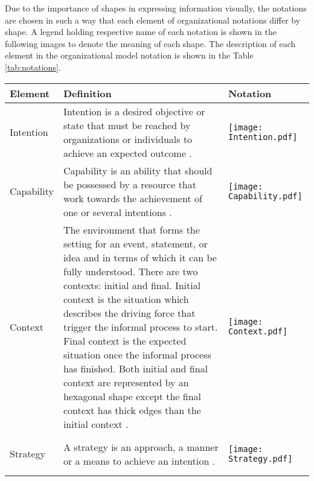 Due to the importance of shapes in expressing information visually, the notations are chosen in such a way that each element of organizational notations differ by shape. A legend holding respective name of each notation is shown in the following images to denote the meaning of each shape. The description of each element in the organizational model notation is shown in the Table \ref{tab:notations}. 

\begin{center}
	\begin{longtable}{p{3cm}p{10cm}p{3cm}}
		\toprule 
		\textbf{Element} & \textbf{Definition} & \textbf{Notation} \\
		\midrule
		\endfirsthead
		Intention 			& Intention is a desired objective or state that must be reached by organizations or individuals to achieve an expected outcome \cite{DelaVaraGonzalez2007}. & \begin{center} \texttt{[image: Intention.pdf]}  \end{center}  \\
		
		Capability	&  Capability is an ability that should be possessed by a resource that work towards the achievement of one or several intentions \cite{Sierr2015}.   & \begin{center} \texttt{[image: Capability.pdf]} \end{center}  \\
		
		Context				& The environment that forms the setting for an event, statement, or idea and in terms of which it can be fully understood. There are two contexts: initial and final. Initial context is the situation which describes the driving force that trigger the informal process to start. Final context is the expected situation once the informal process has finished. Both initial and final context are represented by an hexagonal shape except the final context has thick edges than the initial context \cite{Sierr2015}.  & \begin{center} \texttt{[image: Context.pdf]} \end{center}   \\
		\newline
		Strategy		& \newline  A strategy is an approach, a manner or a means to achieve an intention \cite{Bider2005}.   & \begin{center} \texttt{[image: Strategy.pdf]} \end{center}  \\
		

\end{longtable}
\end{center}
